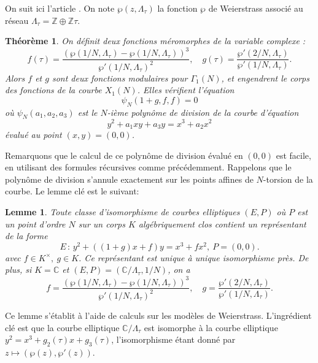 \documentclass[11pt,a4paper]{article}
\newcommand{\Z}{\mathbb{Z}}
\newcommand{\C}{\mathbb{C}}
\newcommand{\de}{\,:\,}
\newtheorem*{thm}{Théorème}
\newtheorem*{lem}{Lemme}
\theoremstyle{definition}
\begin{document}
On suit ici l'article \cite{Baaziz}. On note $\wp(z, \Lambda_\tau)$ la fonction $\wp$ de Weierstrass associé au réseau $\Lambda_\tau = \Z\oplus\Z \tau.$

\begin{thm}
On définit deux fonctions méromorphes de la variable complexe :
$$f(\tau) = \frac{(\wp(1/N, \Lambda_\tau) - \wp(1/N, \Lambda_\tau))^3}{\wp'(1/N, \Lambda_\tau)^2}, \quad
g(\tau) = \frac{\wp'(2/N, \Lambda_\tau)}{\wp'(1/N,\Lambda_\tau)}.$$
Alors $f$ et $g$ sont deux fonctions modulaires pour $\Gamma_1(N)$, et engendrent le corps des fonctions de la courbe $X_1(N)$. Elles vérifient l'équation
$$\psi_N(1+g, f, f) = 0$$
où $\psi_N(a_1, a_2, a_3)$ est le $N$-ième polynôme de division de la courbe d'équation
$$y^2 + a_1xy + a_3y = x^3 + a_2x^2$$
évalué au point $(x, y) = (0, 0)$.
\end{thm}

Remarquons que le calcul de ce polynôme de division évalué en $(0, 0)$ est facile, en utilisant des formules récursives comme précédemment. Rappelons que le polynôme de division s'annule exactement sur les points affines de $N$-torsion de la courbe. Le lemme clé est le suivant:

\begin{lem}
Toute classe d'isomorphisme de courbes elliptiques $(E, P)$ où $P$ est un point d'ordre $N$ sur un corps $K$ algébriquement clos contient un représentant de la forme
$$E\de y^2 + ((1+g) x + f)y = x^3 + fx^2,\ P = (0,0).$$
avec $f\in K^\times,\ g\in K$. Ce représentant est unique à unique isomorphisme près.
De plus, si $K=\C$ et $(E, P) = (\C/\Lambda_\tau, 1/N)$, on a
$$f = \frac{(\wp(1/N, \Lambda_\tau) - \wp(1/N, \Lambda_\tau))^3}{\wp'(1/N, \Lambda_\tau)^2}, \quad  g = \frac{\wp'(2/N, \Lambda_\tau)}{\wp'(1/N,\Lambda_\tau)}.$$
\end{lem}
Ce lemme s'établit à l'aide de calculs sur les modèles de Weierstrass. L'ingrédient clé est que la courbe elliptique $\C/\Lambda_\tau$ est isomorphe à la courbe elliptique $y^2 = x^3 + g_2(\tau) x + g_3(\tau)$, l'isomorphisme étant donné par 
$z\mapsto (\wp(z), \wp'(z))$.
\end{document}
